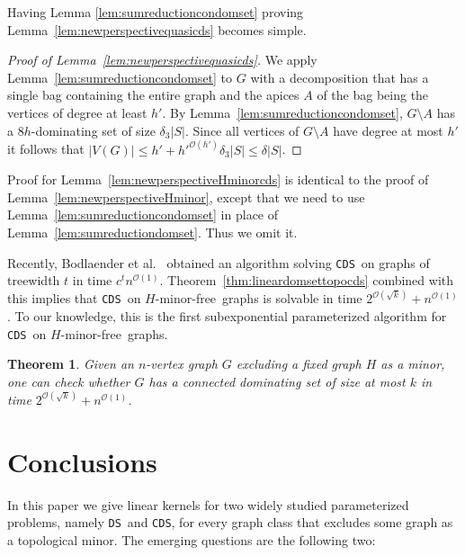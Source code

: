 \documentclass[11pt]{article}
\newtheorem{theorem}{Theorem}
\newcommand{\Hmf}{$H$-minor-free}
\newcommand{\tDS}{{\texttt{\sc DS}}}
\newcommand{\tCDS}{{\texttt{\sc CDS}}}
\newcommand{\cO}{\mathcal{O}}
\begin{document}
Having Lemma \ref{lem:sumreductioncondomset} proving Lemma~\ref{lem:newperspectivequasicds} becomes simple.

\begin{proof}[Proof of Lemma~\ref{lem:newperspectivequasicds}]
We apply Lemma~\ref{lem:sumreductioncondomset} to $G$ with a decomposition that has a single bag containing the entire graph and the apices $A$ of the bag being the vertices of degree at least $h'$. By Lemma~\ref{lem:sumreductioncondomset}, $G \setminus A$ has a $8h$-dominating set of size $\delta_3|S|$. Since all vertices of $G \setminus A$ have degree at most $h'$ it follows that $|V(G)| \leq h' + h'^{\cO(h')}\delta_3 |S| 
\leq \delta|S|$.  
\end{proof}
 



Proof for Lemma~\ref{lem:newperspectiveHminorcds} is identical to the proof of Lemma~\ref{lem:newperspectiveHminor}, except that we need to use Lemma~\ref{lem:sumreductioncondomset} in  
place of Lemma~\ref{lem:sumreductiondomset}. Thus we omit it. 
 



Recently, Bodlaender et al.~\cite{BodlaenderCKN13} obtained an algorithm solving \tCDS \ on graphs of treewidth $t$ in time $c^{t}n^{\cO(1)}$. Theorem~\ref{thm:lineardomsettopocds} combined with this implies that  \tCDS \,  on \Hmf \, graphs is solvable in time $2^{\cO(\sqrt{k})}+ n^{\cO(1)}$. To our knowledge, this is the first subexponential parameterized algorithm for \tCDS \, on \Hmf \, graphs.




\begin{theorem}
\label{thm:subexpcondomset}
Given an $n$-vertex  graph $G$ excluding a fixed graph $H$ as a minor,  one  can check whether $G$ has a connected dominating set of size at most $k$ in time 
$2^{\cO(\sqrt{k})}+ n^{\cO(1)}$. 
\end{theorem}






\section{Conclusions}\label{sec:concludes}
In this paper we give linear kernels for two widely studied parameterized problems, namely \tDS\ and  \tCDS,
for every graph class that excludes some graph as a topological minor. The emerging questions are the following two:
\end{document}
